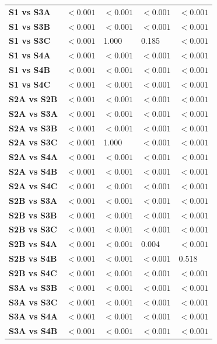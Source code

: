 \begin{table}[H]
{\begin{tabular}{lllll}
        \textbf{S1 vs S3A} & $< 0.001$ & $< 0.001$ & $< 0.001$ & $< 0.001$ \\
        \textbf{S1 vs S3B} & $< 0.001$ & $< 0.001$ & $< 0.001$ & $< 0.001$ \\
        \textbf{S1 vs S3C} & $< 0.001$ & 1.000 & 0.185 & $< 0.001$ \\
        \textbf{S1 vs S4A} & $< 0.001$ & $< 0.001$ & $< 0.001$ & $< 0.001$ \\
        \textbf{S1 vs S4B} & $< 0.001$ & $< 0.001$ & $< 0.001$ & $< 0.001$ \\
        \textbf{S1 vs S4C} & $< 0.001$ & $< 0.001$ & $< 0.001$ & $< 0.001$ \\
        \textbf{S2A vs S2B} & $< 0.001$ & $< 0.001$ & $< 0.001$ & $< 0.001$ \\
        \textbf{S2A vs S3A} & $< 0.001$ & $< 0.001$ & $< 0.001$ & $< 0.001$ \\
        \textbf{S2A vs S3B} & $< 0.001$ & $< 0.001$ & $< 0.001$ & $< 0.001$ \\
        \textbf{S2A vs S3C} & $< 0.001$ & 1.000 & $< 0.001$ & $< 0.001$ \\
        \textbf{S2A vs S4A} & $< 0.001$ & $< 0.001$ & $< 0.001$ & $< 0.001$ \\
        \textbf{S2A vs S4B} & $< 0.001$ & $< 0.001$ & $< 0.001$ & $< 0.001$ \\
        \textbf{S2A vs S4C} & $< 0.001$ & $< 0.001$ & $< 0.001$ & $< 0.001$ \\
        \textbf{S2B vs S3A} & $< 0.001$ & $< 0.001$ & $< 0.001$ & $< 0.001$ \\
        \textbf{S2B vs S3B} & $< 0.001$ & $< 0.001$ & $< 0.001$ & $< 0.001$ \\
        \textbf{S2B vs S3C} & $< 0.001$ & $< 0.001$ & $< 0.001$ & $< 0.001$ \\
        \textbf{S2B vs S4A} & $< 0.001$ & $< 0.001$ & 0.004 & $< 0.001$ \\
        \textbf{S2B vs S4B} & $< 0.001$ & $< 0.001$ & $< 0.001$ & 0.518 \\
        \textbf{S2B vs S4C} & $< 0.001$ & $< 0.001$ & $< 0.001$ & $< 0.001$ \\
        \textbf{S3A vs S3B} & $< 0.001$ & $< 0.001$ & $< 0.001$ & $< 0.001$ \\
        \textbf{S3A vs S3C} & $< 0.001$ & $< 0.001$ & $< 0.001$ & $< 0.001$ \\
        \textbf{S3A vs S4A} & $< 0.001$ & $< 0.001$ & $< 0.001$ & $< 0.001$ \\
        \textbf{S3A vs S4B} & $< 0.001$ & $< 0.001$ & $< 0.001$ & $< 0.001$ \\

\end{tabular}}
\end{table}
